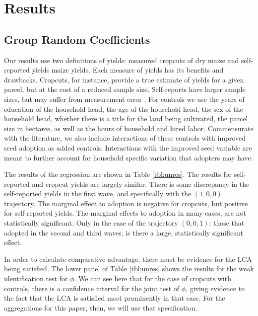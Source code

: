 \documentclass[11pt]{article}
\begin{document}
\section{Results}\label{sec:results}

\subsection{Group Random Coefficients}

Our results use two definitions of yields: measured cropcuts of dry maize and self-reported yields maize yields. Each measure of yields has its benefits and drawbacks. Cropcuts, for instance, provide a true estimate of yields for a given parcel, but at the cost of a reduced sample size. Self-reports have larger sample sizes, but may suffer from measurement error \citep{gollin2021heterogeneity}. For controls we use the years of education of the household head, the age of the household head, the sex of the household head, whether there is a title for the land being cultivated, the parcel size in hectares, as well as the hours of household and hired labor. Commensurate with the literature, we also include interactions of these controls with improved seed adoption as added controls. Interactions with the improved seed variable are meant to further account for household specific variation that adopters may have. 



The results of the regression are shown in Table \ref{tbl:unres}. The results for self-reported and cropcut yields are largely similar. There is some discrepancy in the self-reported yields in the first wave, and specifically with the $(1,0,0)$ trajectory. The marginal effect to adoption is negative for cropcuts, but positive for self-reported yields. The marginal effects to adoption in many cases, are not statistically significant. Only in the case of the trajectory $(0,0,1)$: those that adopted in the second and third waves, is there a large, statistically significant effect.

In order to calculate comparative advantage, there must be evidence for the LCA being satisfied. The lower panel of  Table \ref{tbl:unres} shows the results for the weak identification test for $\phi$. We can see here that for the case of cropcuts with controls, there is a confidence interval for the joint test of $\phi$, giving evidence to the fact that the LCA is satisfied most prominently in that case. For the aggregations for this paper, then, we will use that specification.
\end{document}
